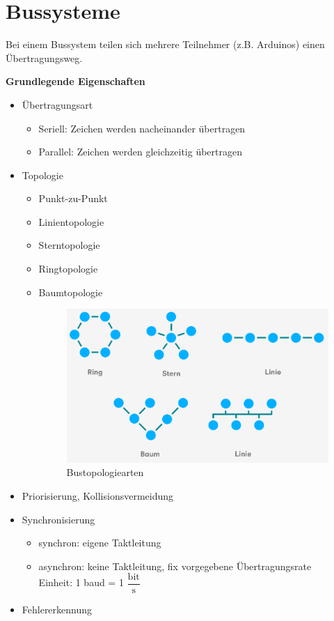 \section{Bussysteme}
Bei einem Bussystem teilen sich mehrere Teilnehmer (z.B. Arduinos) einen Übertragungsweg.

\textbf{Grundlegende Eigenschaften} \\
\begin{itemize}
	\item Übertragungsart
	\begin{itemize}
		\item Seriell: Zeichen werden nacheinander übertragen
		\item Parallel: Zeichen werden gleichzeitig übertragen
	\end{itemize}
	\item Topologie
	\begin{itemize}
		\item Punkt-zu-Punkt
		\item Linientopologie
		\item Sterntopologie
		\item Ringtopologie
		\item Baumtopologie
		\begin{figure}[H]
			\centering
			\includegraphics[width=0.7\linewidth]{figures/topo.png}
			\caption{Bustopologiearten}
		\end{figure}
	\end{itemize}
	\item Priorisierung, Kollisionsvermeidung
	\item Synchronisierung
	\begin{itemize}
		\item synchron: eigene Taktleitung
		\item asynchron: keine Taktleitung, fix vorgegebene Übertragungsrate \\
		Einheit: 1 baud = 1 $\dfrac{\text{bit}}{\text{s}}$
	\end{itemize}
	\item Fehlererkennung
\end{itemize}

